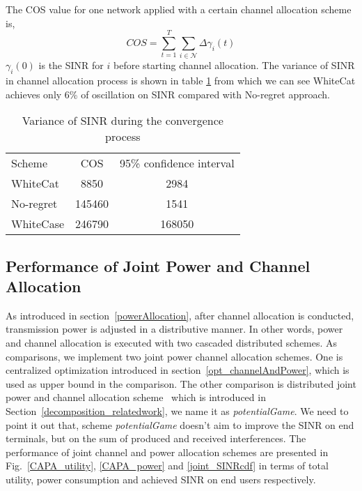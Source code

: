 The COS value for one network applied with a certain channel allocation scheme is,
\begin{equation}
\label{cos}
			COS = \sum\limits_{t=1}^T   \sum\limits_{i\in \mathcal{N}} \varDelta  \gamma_i(t)
			\end{equation}
$\gamma_i(0)$ is the SINR for $i$ before starting channel allocation.
The variance of SINR in channel allocation process is shown in table \ref{costable} from which we can see WhiteCat achieves only 6\% of oscillation on SINR compared with No-regret approach.
\begin{table}[!h]
\centering
\begin{tabular}{|l|c|c|}
  \hline
  Scheme			 						& COS 					& 95\% confidence interval\\
    \hhline{|=|=|=|}
  WhiteCat									& 8850					& 2984\\\hline
  No-regret									& 145460				& 1541\\\hline
  WhiteCase 								& 246790 				& 168050\\ 
  \hline
\end{tabular}
\caption{Variance of SINR during the convergence process}
\label{costable}
\end{table}



\subsection{Performance of Joint Power and Channel Allocation}
\label{joint}

As introduced in section~\ref{powerAllocation}, after channel allocation is conducted, transmission power is adjusted in a distributive manner.
In other words, power and channel allocation is executed with two cascaded distributed schemes.
As comparisons, we implement two joint power channel allocation schemes.
One is centralized optimization introduced in section~\ref{opt_channelAndPower}, which is used as upper bound in the comparison.
The other comparison is distributed joint power and channel allocation scheme~\cite{pimrc_2012} which is introduced in Section~\ref{decomposition_relatedwork}, we name it as \textit{potentialGame}.
We need to point it out that, scheme \textit{potentialGame} doesn't aim to improve the SINR on end terminals, but on the sum of produced and received interferences.
The performance of joint channel and power allocation schemes are presented in Fig.~\ref{CAPA_utility}, \ref{CAPA_power} and \ref{joint_SINRcdf} in terms of total utility, power consumption and achieved SINR on end users respectively.

